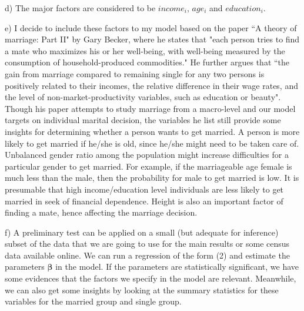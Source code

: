 \documentclass[12pt]{article}
\begin{document}
\par d) The major factors are considered to be $income_i$, $age_i$ and $education_i$. 

\par e) I decide to include these factors to my model based on the paper ``A theory of marriage: Part II" by Gary Becker, where he states that "each person tries to find a mate who maximizes his or her well-being, with well-being measured by the consumption of household-produced commodities." He further argues that ``the gain from marriage compared to remaining single for any two persons is positively related to their incomes, the relative difference in their wage rates, and the level of non-market-productivity variables, such as education or beauty". Though his paper attempts to study marriage from a macro-level and our model targets on individual marital decision, the variables he list still provide some insights for determining whether a person wants to get married. A person is more likely to get married if he/she is old, since he/she might need to be taken care of. Unbalanced gender ratio among the population might increase difficulties for a particular gender to get married. For example, if the marriageable age female is much less than the male, then the probability for male to get married is low. It is presumable that high income/education level individuals are less likely to get married in seek of financial dependence. Height is also an important factor of finding a mate, hence affecting the marriage decision. 

f) A preliminary test can be applied on a small (but adequate for inference) subset of the data that we are going to use for the main results or some census data available online. We can run a regression of the form (2) and estimate the parameters $\boldsymbol{\beta}$ in the model. If the parameters are statistically significant, we have some evidences that the factors we specify in the model are relevant. Meanwhile, we can also get some insights by looking at the summary statistics for these variables for the married group and single group.
\end{document}
